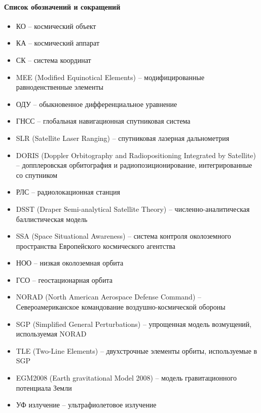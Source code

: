 \paragraph{Список обозначений и сокращений}

\begin{itemize}
    \item КО -- космический объект
    \item КА -- космический аппарат
    \item СК -- система координат
    \item MEE (Modified Equinotical Elements) -- модифицированные равноденственные элементы
    \item ОДУ -- обыкновенное дифференциальное уравнение
    \item ГНСС -- глобальная навигационная спутниковая система
    \item SLR (Satellite Laser Ranging) -- спутниковая лазерная дальнометрия
    \item DORIS (Doppler Orbitography and Radiopositioning Integrated by Satellite) -- допплеровская орбитография и радиопозиционирование, интегрированные со спутником
    \item РЛС -- радиолокационная станция
    \item DSST (Draper Semi-analytical Satellite Theory) -- численно-аналитическая баллистическая модель
    \item SSA (Space Situational Awareness) -- система контроля околоземного пространства Европейского космического агентства
    \item НОО -- низкая околоземная орбита
    \item ГСО -- геостационарная орбита
    \item NORAD (North American Aerospace Defense Command) -- Североамериканское командование воздушно-космической обороны
    \item SGP (Simplified General Perturbations) -- упрощенная модель возмущений, используемая NORAD
    \item TLE (Two-Line Elements) -- двухстрочные элементы орбиты, используемые в SGP
    \item EGM2008 (Earth gravitational Model 2008) -- модель гравитационного потенциала Земли
    \item УФ излучение -- ультрафиолетовое излучение
\end{itemize}

\newpage